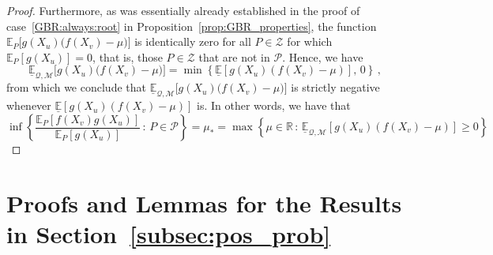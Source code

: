 \documentclass[twoside,11pt]{article}
\newcommand{\reals}{\mathbb{R}}
\newcommand{\lexp}{\underline{\mathbb{E}}_{\rateset,\mathcal{M}}}
\newcommand{\rateset}{\mathcal{Q}}
\begin{document}
\begin{proof}
Furthermore, as was essentially already established in the proof of case~\ref{GBR:always:root} in Proposition~\ref{prop:GBR_properties}, the function $\mathbb{E}_P\bigl[g(X_u)\bigl(f(X_v)-\mu\bigr)\bigr]$ is identically zero for all $P\in\mathcal{Z}$ for which $\mathbb{E}_P[g(X_u)]=0$, that is, those $P\in\mathcal{Z}$ that are not in $\mathcal{P}$. Hence, we have 
\begin{equation*}
\lexp\bigl[g(X_u)\bigl(f(X_v)-\mu\bigr)\bigr] = \min\left\{\underline{\mathbb{E}}[g(X_u)(f(X_v) - \mu)],\,0 \right\}\,,
\end{equation*}
from which we conclude that $\lexp\bigl[g(X_u)\bigl(f(X_v)-\mu\bigr)\bigr]$ is strictly negative whenever $\underline{\mathbb{E}}[g(X_u)(f(X_v) - \mu)]$ is. In other words, we have that
\begin{equation*}
\inf\left\{\frac{\mathbb{E}_P[f(X_v)g(X_u)]}{\mathbb{E}_P[g(X_u)]}\,:\,P\in\mathcal{P}\right\} = \mu_* = \max\left\{ \mu\in\reals\,:\, \lexp[g(X_u)(f(X_v) - \mu)] \geq 0 \right\}
\end{equation*}
\end{proof}


\section{Proofs and Lemmas for the Results in Section~\ref{subsec:pos_prob}}
\end{document}
